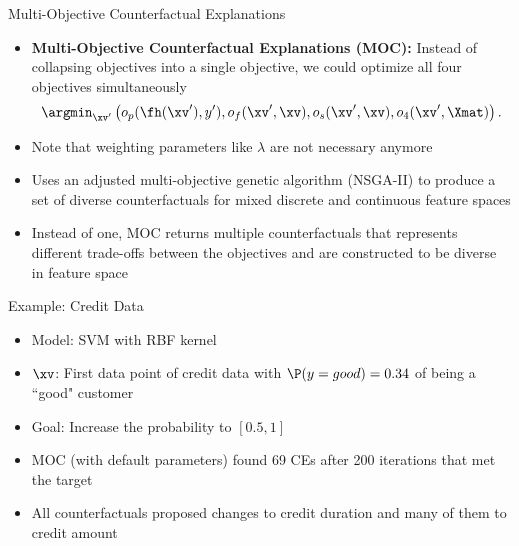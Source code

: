 \documentclass[11pt,compress,t,notes=noshow, aspectratio=169, xcolor=table]{beamer}
\begin{document}
\begin{frame}{Multi-Objective Counterfactual Explanations }
	\begin{itemize}
		\item \textbf{Multi-Objective Counterfactual Explanations (MOC):} Instead of collapsing objectives into a single objective, we could optimize all four objectives simultaneously
	$$	\argmin_{\xv'} \left(o_p(\fh(\xv'), y'), o_f(\xv', \xv), o_s(\xv', \xv), o_4(\xv', \Xmat) \right). $$
		
		\item Note that weighting parameters like $\lambda$ are not necessary anymore
		\item Uses an adjusted multi-objective genetic algorithm (NSGA-II) to produce a set of diverse counterfactuals for mixed discrete and continuous feature spaces
		\item Instead of one, MOC returns multiple counterfactuals that represents different trade-offs between the objectives and are constructed to be diverse in feature space
	\end{itemize}

\end{frame}

\begin{frame}{Example: Credit Data}
	\begin{itemize}
		\item Model: SVM with RBF kernel
		\item $\xv$: First data point of credit data with $\P(y = good)  = 0.34$ of being a ``good" customer
		\item Goal: Increase the probability to $[0.5, 1]$
		\item MOC (with default parameters) found 69 CEs after 200 iterations that met the target
		\item All counterfactuals proposed changes to credit duration and many of them to credit amount
	\end{itemize}
\end{frame}
\end{document}
